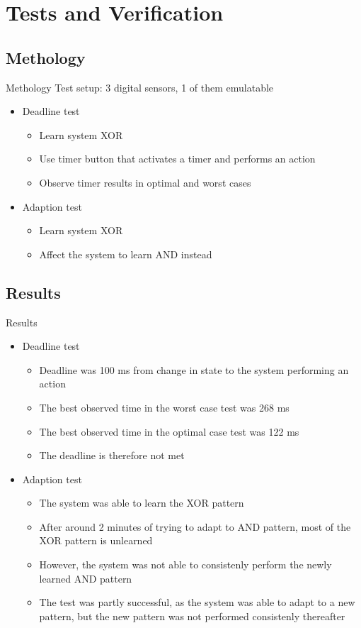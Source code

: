 \section{Tests and Verification}
\subsection{Methology}
\begin{frame}{Methology}
  Test setup: 3 digital sensors, 1 of them emulatable
	\begin{itemize}
		\item Deadline test
      \begin{itemize}
        \item Learn system XOR
        \item Use timer button that activates a timer and performs an action
        \item Observe timer results in optimal and worst cases
      \end{itemize}
    \item Adaption test
      \begin{itemize}
        \item Learn system XOR
        \item Affect the system to learn AND instead
      \end{itemize}
	\end{itemize}
\end{frame}

\subsection{Results}
\begin{frame}{Results}
	\begin{itemize}
		\item Deadline test
      \begin{itemize}
        \item Deadline was 100 ms from change in state to the system performing an action
        \item The best observed time in the worst case test was 268 ms
        \item The best observed time in the optimal case test was 122 ms
        \item The deadline is therefore not met
      \end{itemize}
    \item Adaption test
      \begin{itemize}
        \item The system was able to learn the XOR pattern
        \item After around 2 minutes of trying to adapt to AND pattern, most of the XOR pattern is unlearned
        \item However, the system was not able to consistenly perform the newly learned AND pattern
        \item The test was partly successful, as the system was able to adapt to a new pattern, but the new pattern was not performed consistenly thereafter
      \end{itemize}
	\end{itemize}
\end{frame}

